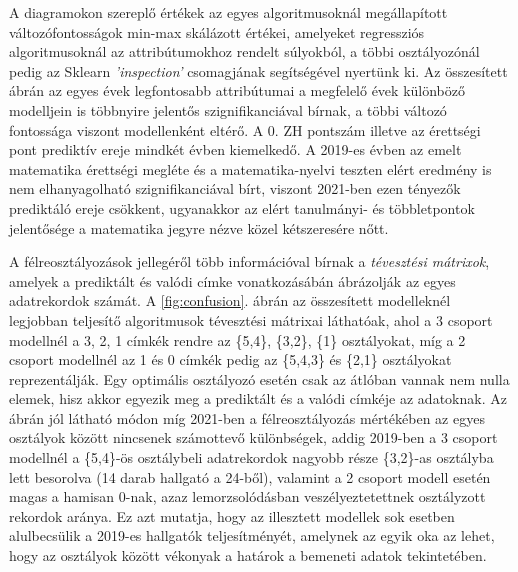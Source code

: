 \documentclass[12pt]{article}
\begin{document}
%	



\noindent A diagramokon szereplő értékek az egyes algoritmusoknál megállapított változófontosságok min-max skálázott értékei, amelyeket regressziós algoritmusoknál az attribútumokhoz rendelt súlyokból, a többi osztályozónál pedig az Sklearn \textit{'inspection'} csomagjának segítségével nyertünk ki. Az összesített ábrán az egyes évek legfontosabb attribútumai a megfelelő évek különböző modelljein is többnyire jelentős szignifikanciával bírnak, a többi változó fontossága viszont modellenként eltérő. A 0. ZH pontszám illetve az érettségi pont prediktív ereje mindkét évben kiemelkedő. A 2019-es évben az emelt matematika érettségi megléte és a matematika-nyelvi teszten elért eredmény is nem elhanyagolható szignifikanciával bírt, viszont 2021-ben ezen tényezők prediktáló ereje csökkent, ugyanakkor az elért tanulmányi- és többletpontok jelentősége a matematika jegyre nézve közel kétszeresére nőtt.

A félreosztályozások jellegéről több információval bírnak a \emph{tévesztési mátrixok}, amelyek a prediktált és valódi címke vonatkozásábán ábrázolják az egyes adatrekordok számát. A \ref{fig:confusion}. ábrán az összesített modelleknél legjobban teljesítő algoritmusok tévesztési mátrixai láthatóak, ahol a 3 csoport modellnél a 3, 2, 1 címkék rendre az \{5,4\}, \{3,2\}, \{1\} osztályokat, míg a 2 csoport modellnél az 1 és 0 címkék pedig az \{5,4,3\} és \{2,1\} osztályokat reprezentálják. Egy optimális osztályozó esetén csak az átlóban vannak nem nulla elemek, hisz akkor egyezik meg a prediktált és a valódi címkéje az adatoknak. Az ábrán jól látható módon míg 2021-ben a félreosztályozás mértékében az egyes osztályok között nincsenek számottevő különbségek, addig 2019-ben a 3 csoport modellnél a \{5,4\}-ös osztálybeli adatrekordok nagyobb része \{3,2\}-as osztályba lett besorolva (14 darab hallgató a 24-ből), valamint a 2 csoport modell esetén magas a hamisan 0-nak, azaz lemorzsolódásban veszélyeztetettnek osztályzott rekordok aránya. Ez azt mutatja, hogy az illesztett modellek sok esetben alulbecsülik a 2019-es hallgatók teljesítményét, amelynek az egyik oka az lehet, hogy az osztályok között vékonyak a határok a bemeneti adatok tekintetében.
\end{document}
